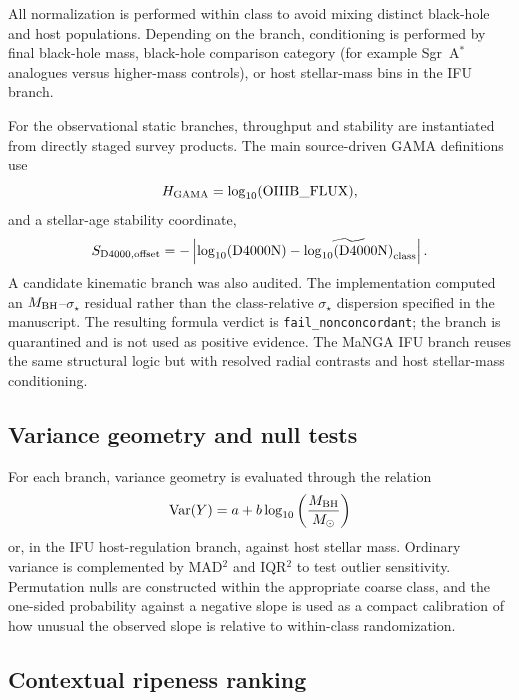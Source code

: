 \documentclass[11pt]{article}
\begin{document}
All normalization is performed within class to avoid mixing distinct black-hole and host populations. Depending on the branch, conditioning is performed by final black-hole mass, black-hole comparison category (for example Sgr~A$^\ast$ analogues versus higher-mass controls), or host stellar-mass bins in the IFU branch.

For the observational static branches, throughput and stability are instantiated from directly staged survey products. The main source-driven GAMA definitions use
\begin{equation}
H_{\rm GAMA}=\log_{10}({\rm OIIIB\_FLUX}),
\end{equation}
and a stellar-age stability coordinate,
  \begin{equation}
  S_{\rm D4000,offset}=-\left|\log_{10}({\rm D4000N})-\widetilde{\log_{10}({\rm D4000N})}_{\rm class}\right|.
  \end{equation}
  A candidate kinematic branch was also audited. The implementation computed an $M_{\rm BH}$--$\sigma_\star$ residual rather than the class-relative $\sigma_\star$ dispersion specified in the manuscript. The resulting formula verdict is \texttt{fail\_nonconcordant}; the branch is quarantined and is not used as positive evidence.
The MaNGA IFU branch reuses the same structural logic but with resolved radial contrasts and host stellar-mass conditioning.

\subsection{Variance geometry and null tests}

For each branch, variance geometry is evaluated through the relation
\begin{equation}
\mathrm{Var}(Y)=a+b\log_{10}\left(\frac{M_{\rm BH}}{M_\odot}\right)
\end{equation}
or, in the IFU host-regulation branch, against host stellar mass. Ordinary variance is complemented by MAD$^2$ and IQR$^2$ to test outlier sensitivity. Permutation nulls are constructed within the appropriate coarse class, and the one-sided probability against a negative slope is used as a compact calibration of how unusual the observed slope is relative to within-class randomization.

\subsection{Contextual ripeness ranking}
\end{document}
